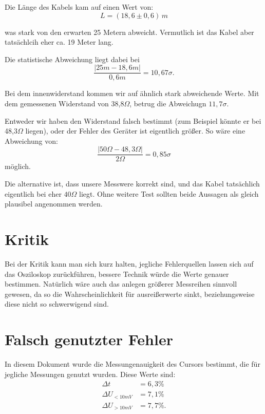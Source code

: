 Die Länge des Kabels kam auf einen Wert von: 
\begin{equation}
\boxed{
    L = (18,6 \pm 0,6) \, m
}
\end{equation}

was stark von den erwarten 25 Metern abweicht. Vermutlich ist das Kabel aber tatsächlcih eher ca. 19 Meter lang.

Die statistische Abweichung liegt dabei bei
\begin{equation}
    \frac{\left| 25m-18,6m \right|}{0,6m} = 10,67\sigma.
\end{equation}

Bei dem innenwiderstand kommen wir auf ähnlich stark abweichende Werte. Mit dem gemessenen Widerstand von 38,8$\Omega$, betrug die Abweichugn $11,7\sigma$.

Entweder wir haben den Widerstand falsch bestimmt (zum Beispiel könnte er bei 48,3$\Omega$ liegen), oder der Fehler des Geräter ist eigentlich größer. So wäre eine Abweichung von:
\begin{equation}
    \frac{\left| 50 \Omega - 48,3 \Omega  \right|}{2 \Omega} = 0,85\sigma
\end{equation}
möglich.

Die alternative ist, dass unsere Messwere korrekt sind, und das Kabel tatsächlich eigentlich bei eher $40\Omega$ liegt. Ohne weitere Test sollten beide Aussagen als gleich plausibel angenommen werden.

\section{Kritik}

Bei der Kritik kann man sich kurz halten, jegliche Fehlerquellen lassen sich auf das Osziloskop zurückführen, bessere Technik würde die Werte genauer bestimmen. Natürlich wäre auch das anlegen größerer Messreihen sinnvoll gewesen, da so die Wahrscheinlichkeit für ausreißerwerte sinkt, beziehungsweise diese nicht so schwerwigend sind.

\section{Falsch genutzter Fehler}
\label{sec:korrektur_des_Fehlers}

In diesem Dokument wurde die Messungenauigkeit des Cursors bestimmt, die für jegliche Messungen genutzt wurden. Diese Werte sind:
\begin{align*}
    \Delta t &= 6,3\%\\
    \Delta U_{<10mV} &= 7,1\% \\
    \Delta U_{>10mV} &= 7,7\%.
\end{align*}

